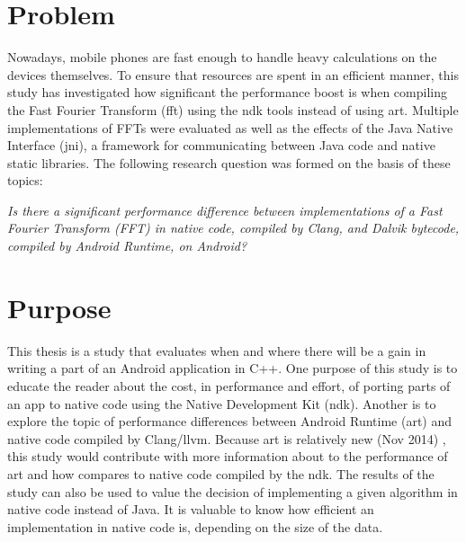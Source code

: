 \section{Problem}
Nowadays, mobile phones are fast enough to handle heavy calculations on the devices themselves. To ensure that resources are spent in an efficient manner, this study has investigated how significant the performance boost is when compiling the Fast Fourier Transform (\gls{fft}) using the \gls{ndk} tools instead of using \gls{art}. Multiple implementations of FFTs were evaluated as well as the effects of the Java Native Interface (\gls{jni}), a framework for communicating between Java code and native static libraries. The following research question was formed on the basis of these topics:

\begin{center}
    \textit{Is there a significant performance difference between implementations of a Fast Fourier Transform (FFT) in native code, compiled by Clang, and Dalvik bytecode, compiled by Android Runtime, on Android?}
\end{center}

\section{Purpose}
This thesis is a study that evaluates when and where there will be a gain in writing a part of an Android application in C++. One purpose of this study is to educate the reader about the cost, in performance and effort, of porting parts of an app to native code using the Native Development Kit (\gls{ndk}). Another is to explore the topic of performance differences between Android Runtime (\gls{art}) and native code compiled by Clang/\gls{llvm}. Because \gls{art} is relatively new (Nov 2014) \cite{android:dalvik:release}, this study would contribute with more information about to the performance of \gls{art} and how compares to native code compiled by the \gls{ndk}. The results of the study can also be used to value the decision of implementing a given algorithm in native code instead of Java. It is valuable to know how efficient an implementation in native code is, depending on the size of the data.

